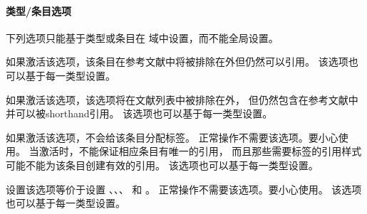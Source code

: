 \paragraph{类型/条目选项}%
\label{use:opt:bib:ded}
下列选项只能基于类型或条目在  域中设置，而不能全局设置。
\begin{optionlist}



如果激活该选项，该条目在参考文献中将被排除在外但仍然可以引用。
该选项也可以基于每一类型设置。



如果激活该选项，该选项将在文献列表中被排除在外，
但仍然包含在参考文献中并可以被shorthand引用。
该选项也可以基于每一类型设置。



如果激活该选项，\biblatex 不会给该条目分配标签。
正常操作不需要该选项。要小心使用。
当激活时，\biblatex 不能保证相应条目有唯一的引用，
而且那些需要标签的引用样式可能不能为该条目创建有效的引用。
该选项也可以基于每一类型设置。



设置该选项等价于设置 、、、 和 。
正常操作不需要该选项。要小心使用。
该选项也可以基于每一类型设置。

\end{optionlist}

